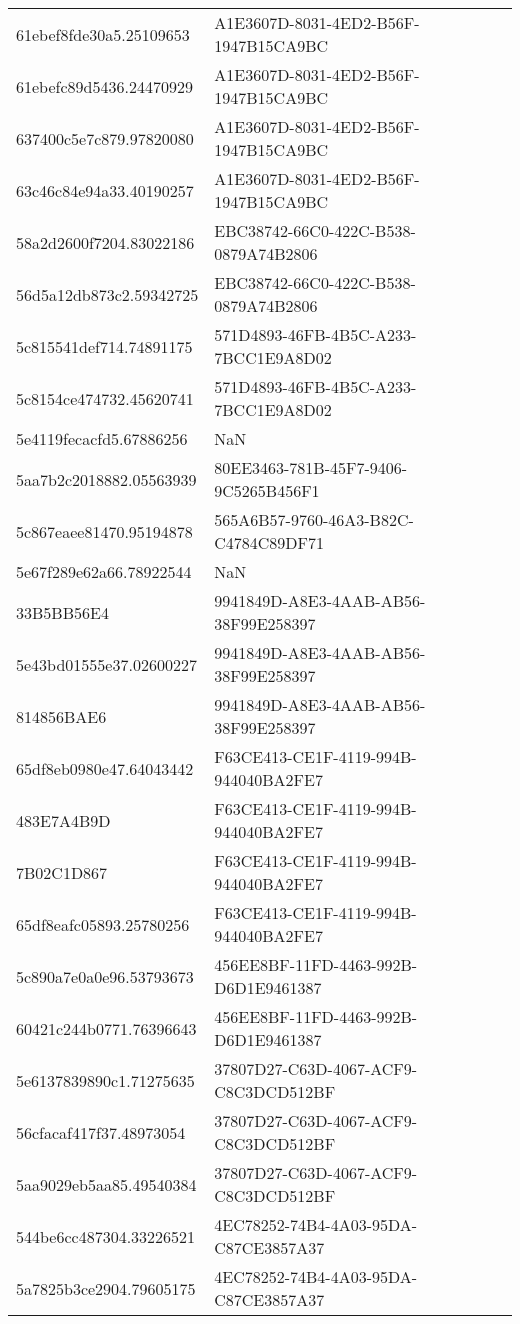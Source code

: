 \begin{tabular}{ll}
61ebef8fde30a5.25109653 & A1E3607D-8031-4ED2-B56F-1947B15CA9BC \\
61ebefc89d5436.24470929 & A1E3607D-8031-4ED2-B56F-1947B15CA9BC \\
637400c5e7c879.97820080 & A1E3607D-8031-4ED2-B56F-1947B15CA9BC \\
63c46c84e94a33.40190257 & A1E3607D-8031-4ED2-B56F-1947B15CA9BC \\
58a2d2600f7204.83022186 & EBC38742-66C0-422C-B538-0879A74B2806 \\
56d5a12db873c2.59342725 & EBC38742-66C0-422C-B538-0879A74B2806 \\
5c815541def714.74891175 & 571D4893-46FB-4B5C-A233-7BCC1E9A8D02 \\
5c8154ce474732.45620741 & 571D4893-46FB-4B5C-A233-7BCC1E9A8D02 \\
5e4119fecacfd5.67886256 & NaN \\
5aa7b2c2018882.05563939 & 80EE3463-781B-45F7-9406-9C5265B456F1 \\
5c867eaee81470.95194878 & 565A6B57-9760-46A3-B82C-C4784C89DF71 \\
5e67f289e62a66.78922544 & NaN \\
33B5BB56E4 & 9941849D-A8E3-4AAB-AB56-38F99E258397 \\
5e43bd01555e37.02600227 & 9941849D-A8E3-4AAB-AB56-38F99E258397 \\
814856BAE6 & 9941849D-A8E3-4AAB-AB56-38F99E258397 \\
65df8eb0980e47.64043442 & F63CE413-CE1F-4119-994B-944040BA2FE7 \\
483E7A4B9D & F63CE413-CE1F-4119-994B-944040BA2FE7 \\
7B02C1D867 & F63CE413-CE1F-4119-994B-944040BA2FE7 \\
65df8eafc05893.25780256 & F63CE413-CE1F-4119-994B-944040BA2FE7 \\
5c890a7e0a0e96.53793673 & 456EE8BF-11FD-4463-992B-D6D1E9461387 \\
60421c244b0771.76396643 & 456EE8BF-11FD-4463-992B-D6D1E9461387 \\
5e6137839890c1.71275635 & 37807D27-C63D-4067-ACF9-C8C3DCD512BF \\
56cfacaf417f37.48973054 & 37807D27-C63D-4067-ACF9-C8C3DCD512BF \\
5aa9029eb5aa85.49540384 & 37807D27-C63D-4067-ACF9-C8C3DCD512BF \\
544be6cc487304.33226521 & 4EC78252-74B4-4A03-95DA-C87CE3857A37 \\
5a7825b3ce2904.79605175 & 4EC78252-74B4-4A03-95DA-C87CE3857A37 \\

\end{tabular}
